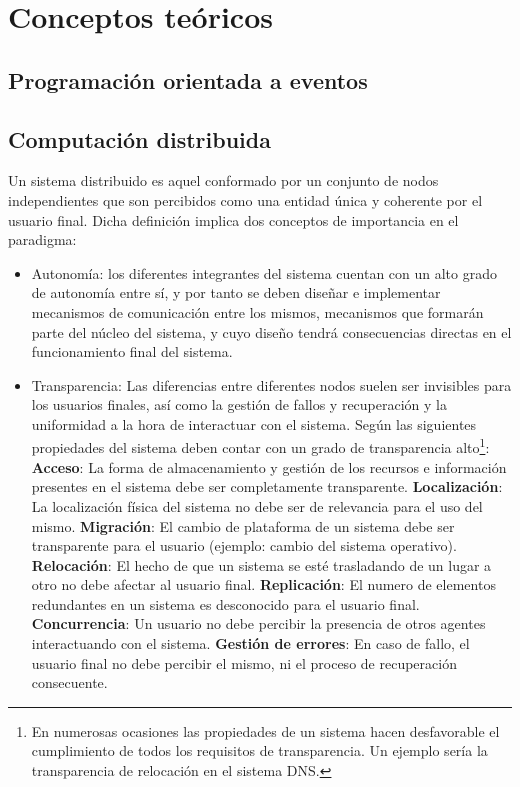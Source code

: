 
\chapter{Conceptos teóricos}

\section{Programación orientada a eventos}
\label{eventdriven}
\section{Computación distribuida}

Un sistema distribuido es aquel conformado por un conjunto de nodos independientes que son percibidos como una entidad única y coherente por el usuario final. Dicha definición implica dos conceptos de importancia en el paradigma:

\begin{itemize}
  \item Autonomía: los diferentes integrantes del sistema cuentan con un alto grado de autonomía entre sí, y por tanto se deben diseñar e implementar mecanismos de comunicación entre los mismos, mecanismos que formarán parte del núcleo del sistema, y cuyo diseño tendrá consecuencias directas en el funcionamiento final del sistema.
  \item Transparencia: Las diferencias entre diferentes nodos suelen ser invisibles para los usuarios finales, así como la gestión de fallos y recuperación y la uniformidad a la hora de interactuar con el sistema. Según \citationneeded las siguientes propiedades del sistema deben contar con un grado de transparencia alto\footnote{En numerosas ocasiones las propiedades de un sistema hacen desfavorable el cumplimiento de todos los requisitos de transparencia. Un ejemplo sería la transparencia de relocación en el sistema DNS.}:
  \subitem \textbf{Acceso}: La forma de almacenamiento y gestión de los recursos e información presentes en el sistema debe ser completamente transparente.
  \subitem \textbf{Localización}: La localización física del sistema no debe ser de relevancia para el uso del mismo.
  \subitem \textbf{Migración}: El cambio de plataforma de un sistema debe ser transparente para el usuario (ejemplo: cambio del sistema operativo).
  \subitem \textbf{Relocación}: El hecho de que un sistema se esté trasladando de un lugar a otro no debe afectar al usuario final.
  \subitem \textbf{Replicación}: El numero de elementos redundantes en un sistema es desconocido para el usuario final.
  \subitem \textbf{Concurrencia}: Un usuario no debe percibir la presencia de otros agentes interactuando con el sistema.
  \subitem \textbf{Gestión de errores}: En caso de fallo, el usuario final no debe percibir el mismo, ni el proceso de recuperación consecuente.
\end{itemize}

